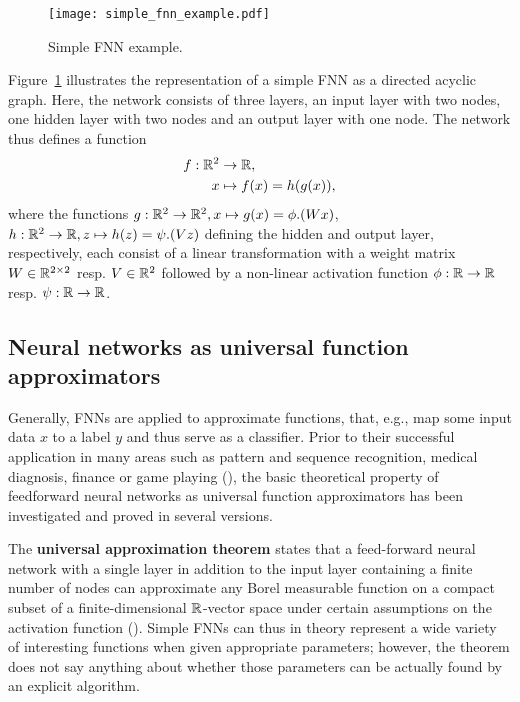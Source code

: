 \begin{figure}
	\texttt{[image: simple\_fnn\_example.pdf]}
	\caption{Simple FNN example.}
	\label{fig:simple_fnn}
\end{figure}

Figure~\ref{fig:simple_fnn} illustrates the representation of a simple FNN as a directed acyclic graph. Here, the network consists of three layers, an input layer with two nodes, one hidden layer with two nodes and an output layer with one node. The network thus defines a function 
\begin{equation*}
\begin{split}
	f:\mathbb{R}^2 &\to \mathbb{R}, \\
	x&\mapsto f(x) = h(g(x)),
	\end{split}
\end{equation*}
where the functions $g: \mathbb{R}^2 \to \mathbb{R}^2, x \mapsto g(x) = \phi.(Wx)$, $h: \mathbb{R}^2 \to \mathbb{R}, z\mapsto h(z) = \psi.(Vz)$ defining the hidden and output layer, respectively, each consist of a linear transformation with a weight matrix $W\in\mathbb{R}^{2\times 2}$ resp. $V\in\mathbb{R}^2$ followed by a non-linear activation function $\phi:\mathbb{R}\to\mathbb{R}$ resp. $\psi:\mathbb{R}\to\mathbb{R}$. 

\subsection{Neural networks as universal function approximators}\label{sec:nns_universal_approximators}

Generally, FNNs are applied to approximate functions, that, e.g., map some input data $x$ to a label $y$ and thus serve as a classifier. Prior to their successful application in many areas such as pattern and sequence recognition, medical diagnosis, finance or game playing (\cite[pp.~22-26]{Goodfellow2016}), the basic theoretical property of feedforward neural networks as universal function approximators has been investigated and proved in several versions. 

The \textbf{universal approximation theorem} states that a feed-forward neural network with a single layer in addition to the input layer containing a finite number of nodes can approximate any Borel measurable function on a compact subset of a finite-dimensional $\mathbb{R}$-vector space under certain assumptions on the activation function (\cite[pp.~194f.]{Goodfellow2016}). Simple FNNs can thus in theory represent a wide variety of interesting functions when given appropriate parameters; however, the theorem does not say anything about whether those parameters can be actually found by an explicit algorithm. 

